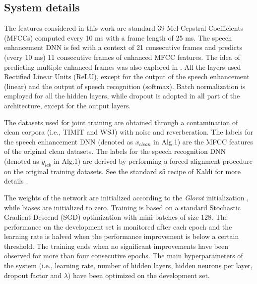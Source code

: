 \documentclass{article}
\begin{document}
\subsection{System details}
The features considered in this work are standard 39 Mel-Cepstral Coefficients (MFCCs) computed every 10 ms with a frame length of 25 ms. The speech enhancement DNN is fed with a context of 21 consecutive frames and predicts (every 10 ms) 11 consecutive frames of enhanced MFCC features. The idea of predicting multiple enhanced frames was also explored in \cite{joint3}. %
All the layers used Rectified Linear Units (ReLU), except for the output of the speech enhancement (linear) and the output of speech recognition (softmax).
Batch normalization \cite{batchnorm} is employed for all the hidden layers, while dropout \cite{dropout} is adopted in all part of the architecture, except for the output layers. %

The datasets used for joint training are obtained through a contamination of clean corpora (i.e., TIMIT and WSJ) with noise and reverberation. %
The labels for the speech enhancement DNN (denoted as $x_{clean}$ in Alg.1) are the MFCC features of the original clean datasets.
The labels for the speech recognition DNN (denoted as $y_{lab}$ in Alg.1) are derived by performing a forced alignment procedure on the original training datasets. See the standard s5 recipe of Kaldi for more details \cite{kaldi}.

The weights of the network are initialized according to the \textit{Glorot} initialization \cite{xavier}, while biases are initialized to zero.
Training is based on a standard Stochastic Gradient Descend (SGD) optimization with mini-batches of size 128. The performance on the development set is monitored after each epoch and the learning rate is halved when the performance improvement is below a certain threshold. The training ends when no significant improvements have been observed for more than four consecutive epochs. %
The main hyperparameters of the system (i.e., learning rate, number of hidden layers, hidden neurons per layer, dropout factor and $\lambda$) have been optimized on the development set. 
\end{document}
